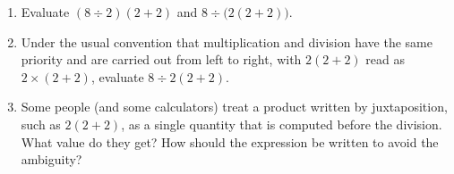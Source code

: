 \begin{enumerate}
\item[(a)] Evaluate $(8\div2)(2+2)$ and $8\div\bigl(2(2+2)\bigr)$.
\item[(b)] Under the usual convention that multiplication and division have the same priority and are carried out from left to right, with $2(2+2)$ read as $2\times(2+2)$, evaluate $8\div2(2+2)$.
\item[(c)] Some people (and some calculators) treat a product written by juxtaposition, such as $2(2+2)$, as a single quantity that is computed before the division. What value do they get? How should the expression be written to avoid the ambiguity?
\end{enumerate}
